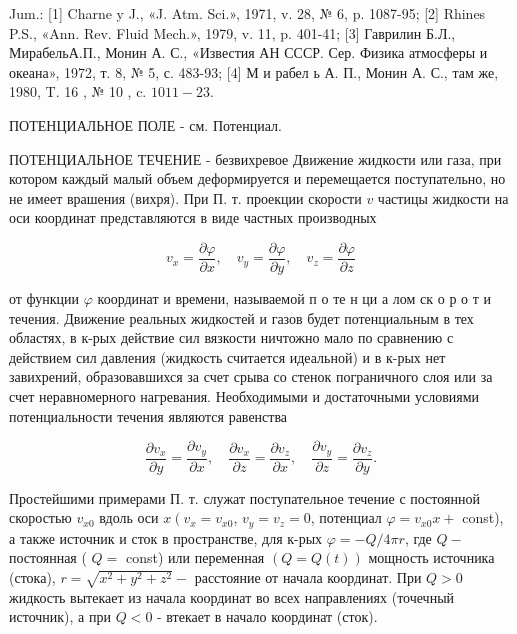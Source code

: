 \documentclass[10pt]{article}
\begin{document}
Jum.: [1] Charne y J., «J. Atm. Sci.», 1971, v. 28, № 6, p. 1087-95; [2] Rhines P.S., «Ann. Rev. Fluid Mech.», 1979, v. 11, p. 401-41; [3] Гаврилин Б.Л., МирабельА.П., Монин А. С., «Известия АН СССР. Сер. Физика атмосферы и океана», 1972, т. 8, № 5, с. 483-93; [4] М и рабел ь А. П., Монин А. С., там же, 1980, T. 16 , № 10 , c. $1011-23$.



ПОТЕНЦИАЛЬНОЕ ПОЛЕ - см. Потенциал.



ПОТЕНЦИАЛЬНОЕ ТЕЧЕНИЕ - безвихревое Движение жидкости или газа, при котором каждый малый объем деформируется и перемещается поступательно, но не имеет врашения (вихря). При П. т. проекции скорости $v$ частицы жидкости на оси координат представляются в виде частных производных



\[

v_{x}=\frac{\partial \varphi}{\partial x}, \quad v_{y}=\frac{\partial \varphi}{\partial y}, \quad v_{z}=\frac{\partial \varphi}{\partial z}

\]



от функции $\varphi$ координат и времени, называемой п о те н ци а лом ск о р о т и течения. Движение реальных жидкостей и газов будет потенциальным в тех областях, в к-рых действие сил вязкости ничтожно мало по сравнению с действием сил давления (жидкость считается идеальной) и в к-рых нет завихрений, образовавшихся за счет срыва со стенок пограничного слоя или за счет неравномерного нагревания. Необходимыми и достаточными условиями потенциальности течения являются равенства



\[

\frac{\partial v_{x}}{\partial y}=\frac{\partial v_{y}}{\partial x}, \quad \frac{\partial v_{x}}{\partial z}=\frac{\partial v_{z}}{\partial x}, \quad \frac{\partial v_{y}}{\partial z}=\frac{\partial v_{z}}{\partial y} .

\]



Простейшими примерами П. т. служат поступательное течение с постоянной скоростью $v_{x 0}$ вдоль оси $x\left(v_{x}=v_{x 0}\right.$, $v_{y}=v_{z}=0$, потенциал $\varphi=v_{x 0} x+$ const), а также источник и сток в пространстве, для к-рых $\varphi=-Q / 4 \pi r$, где $Q-$ постоянная ( $Q=$ const) или переменная $(Q=Q(t))$ мощность источника (стока), $r=\sqrt{x^{2}+y^{2}+z^{2}}-$ расстояние от начала координат. При $Q>0$ жидкость вытекает из начала координат во всех направлениях (точечный источник), а при $Q<0$ - втекает в начало координат (сток).
\end{document}
